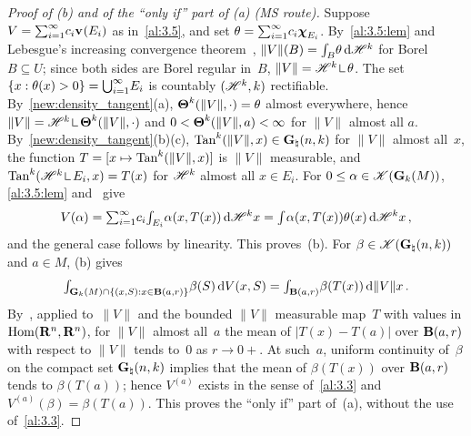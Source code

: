 \begin{proof}[Proof of (b) and of the ``only if'' part of (a) (MS route)]
    Suppose $V = {\textstyle\sum_{i=1}^{\infty}} c_i \mathbf{v}_{}(E_i)$ as in~\ref{al:3.5}, and set $\theta =
    {\textstyle\sum_{i=1}^{\infty}} c_i \boldsymbol{\chi}_{E_i}$. By~\ref{al:3.5:lem} and Lebesgue's increasing convergence
    theorem~\cite[2.4.7]{Federer1969}, $\|V\|(B) = {\textstyle\int_{B}^{}} \theta \,\mathrm{d} \mathscr{H}^{k}$ for Borel
    $B \subseteq U$; since both sides are Borel regular in~$B$, $\|V\| = \HM^{\vdim} \restrict
    \theta$. The set $\{ x : \theta(x) > 0 \} = {{\textstyle \bigcup}}_{i=1}^\infty E_i$ is countably
    $(\mathscr{H}^{k},k)$ rectifiable. By~\ref{new:density_tangent}(a),
    $\boldsymbol{\Theta}^{k}(\|V\|,\cdot) = \theta$ almost everywhere, hence $\|V\| = \HM^{\vdim} \restrict
    \density^{\vdim}(\|V\|,\cdot)$ and $0 < \boldsymbol{\Theta}^{k}(\|V\|,a) < \infty$ for $\|V\|$ almost all
    $a$. By~\ref{new:density_tangent}(b)(c), $\operatorname{Tan}^{k}(\|V\|,x) \in \mathbf{G}_{\natural}(n,k)$
    for $\|V\|$ almost all~$x$, the function $T = [x \mapsto \operatorname{Tan}^{k}(\|V\|,x)]$ is $\|V\|$
    measurable, and $\Tan^{\vdim}(\HM^{\vdim} \restrict E_i, x) = T(x)$ for $\mathscr{H}^{k}$ almost
    all $x \in E_i$. For $0 \le \alpha \in \mathscr{K}(\mathbf{G}_{k}(M))$, \ref{al:3.5:lem} and~\cite[2.4.7]{Federer1969}
    give
    \begin{displaymath}
        V(\alpha) = {\textstyle\sum_{i=1}^{\infty}} c_i {\textstyle\int_{E_i}^{}} \alpha(x, T(x)) \,\mathrm{d} \mathscr{H}^{k} x =
        {\textstyle\int_{}^{}} \alpha(x, T(x)) \theta(x) \,\mathrm{d} \mathscr{H}^{k} x \,,
    \end{displaymath}
    and the general case follows by linearity. This proves~(b). For $\beta \in
    \mathscr{K}(\mathbf{G}_{\natural}(n,k))$ and $a \in M$, (b) gives
    \begin{displaymath}
        {\textstyle\int_{\mathbf{G}_{k}(M) \cap \{ (x,S) : x \in \mathbf{B}(a,r) \}}^{}} \beta(S) \,\mathrm{d} V(x,S) =
        {\textstyle\int_{\mathbf{B}(a,r)}^{}} \beta(T(x)) \,\mathrm{d} \|V\| x \,.
    \end{displaymath}
    By~\cite[2.8.18, 2.9.9]{Federer1969}, applied to~$\|V\|$ and the bounded $\|V\|$ measurable
    map~$T$ with values in $\operatorname{Hom}(\mathbf{R}^{n},\mathbf{R}^{n})$, for $\|V\|$ almost all~$a$ the mean of
    $|T(x) - T(a)|$ over $\mathbf{B}(a,r)$ with respect to $\|V\|$ tends to~$0$ as $r \to 0+$. At
    such~$a$, uniform continuity of~$\beta$ on the compact set $\mathbf{G}_{\natural}(n,k)$ implies
    that the mean of $\beta(T(x))$ over $\mathbf{B}(a,r)$ tends to $\beta(T(a))$; hence $V^{(a)}$
    exists in the sense of~\ref{al:3.3} and $V^{(a)}(\beta) = \beta(T(a))$. This proves the ``only
    if'' part of~(a), without the use of~\ref{al:3.3}.
\end{proof}


